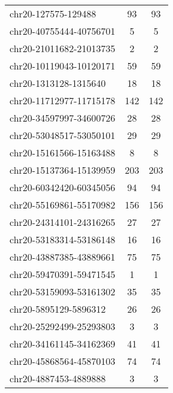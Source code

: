 \begin{longtable}{lSS}
	chr20-127575-129488     & 93     & 93                                        \\
	chr20-40755444-40756701 & 5      & 5                                         \\
	chr20-21011682-21013735 & 2      & 2                                         \\
	chr20-10119043-10120171 & 59     & 59                                        \\
	chr20-1313128-1315640   & 18     & 18                                        \\
	chr20-11712977-11715178 & 142    & 142                                       \\
	chr20-34597997-34600726 & 28     & 28                                        \\
	chr20-53048517-53050101 & 29     & 29                                        \\
	chr20-15161566-15163488 & 8      & 8                                         \\
	chr20-15137364-15139959 & 203    & 203                                       \\
	chr20-60342420-60345056 & 94     & 94                                        \\
	chr20-55169861-55170982 & 156    & 156                                       \\
	chr20-24314101-24316265 & 27     & 27                                        \\
	chr20-53183314-53186148 & 16     & 16                                        \\
	chr20-43887385-43889661 & 75     & 75                                        \\
	chr20-59470391-59471545 & 1      & 1                                         \\
	chr20-53159093-53161302 & 35     & 35                                        \\
	chr20-5895129-5896312   & 26     & 26                                        \\
	chr20-25292499-25293803 & 3      & 3                                         \\
	chr20-34161145-34162369 & 41     & 41                                        \\
	chr20-45868564-45870103 & 74     & 74                                        \\
	chr20-4887453-4889888   & 3      & 3                                         \\

\end{longtable}

